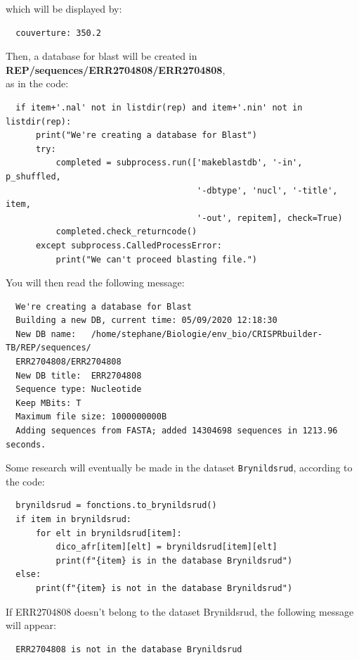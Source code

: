 \documentclass[twoside,a4paper,11pt,frenchb,openany]{report}
\begin{document}
    which will be displayed by:

    \begin{verbatim}
  couverture: 350.2        
\end{verbatim}

    Then, a database for blast will be created in
\textbf{REP/sequences/ERR2704808/ERR2704808}, \\as in the code:

\begin{verbatim}
  if item+'.nal' not in listdir(rep) and item+'.nin' not in listdir(rep):
      print("We're creating a database for Blast")
      try:
          completed = subprocess.run(['makeblastdb', '-in', p_shuffled,
                                      '-dbtype', 'nucl', '-title', item,
                                      '-out', repitem], check=True)
          completed.check_returncode()
      except subprocess.CalledProcessError:
          print("We can't proceed blasting file.")
\end{verbatim}

    You will then read the following message:

    \begin{verbatim}
  We're creating a database for Blast
  Building a new DB, current time: 05/09/2020 12:18:30
  New DB name:   /home/stephane/Biologie/env_bio/CRISPRbuilder-TB/REP/sequences/
  ERR2704808/ERR2704808
  New DB title:  ERR2704808
  Sequence type: Nucleotide
  Keep MBits: T
  Maximum file size: 1000000000B
  Adding sequences from FASTA; added 14304698 sequences in 1213.96 seconds.
\end{verbatim}

    Some research will eventually be made in the dataset \texttt{Brynildsrud},
according to the code:

\begin{verbatim}
  brynildsrud = fonctions.to_brynildsrud()
  if item in brynildsrud:
      for elt in brynildsrud[item]:
          dico_afr[item][elt] = brynildsrud[item][elt]
          print(f"{item} is in the database Brynildsrud")
  else:
      print(f"{item} is not in the database Brynildsrud")
\end{verbatim}

    If ERR2704808 doesn't belong to the dataset Brynildsrud, the following
message will appear:

    \begin{verbatim}
  ERR2704808 is not in the database Brynildsrud
\end{verbatim}
\end{document}
